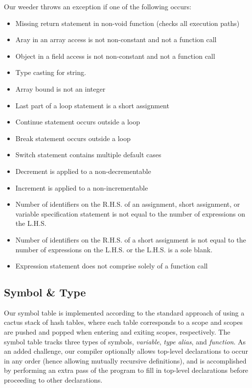 \documentclass{article}
\begin{document}
Our weeder throws an exception if one of the following occurs:
\begin{itemize}
\item Missing return statement in non-void function (checks all execution paths)
\item Aray in an array access is not non-constant and not a function call
\item Object in a field access is not non-constant and not a function call
\item Type casting for string.
\item Array bound is not an integer
\item Last part of a loop statement is a short assignment
\item Continue statement occurs outside a loop
\item Break statement occurs outside a loop
\item Switch statement contains multiple default cases
\item Decrement is applied to a non-decrementable
\item Increment is applied to a non-incrementable
\item Number of identifiers on the R.H.S. of an assignment, short assignment, or variable specification statement is not equal to the number of expressions on the L.H.S.
\item Number of identifiers on the R.H.S. of a short assignment is not equal to the number of expressions on the L.H.S. or the L.H.S. is a sole blank.
\item Expression statement does not comprise solely of a function call
\end{itemize}

\subsection{Symbol \& Type}

Our symbol table is implemented according to the standard approach of using a cactus stack of hash tables, where each table corresponds to a scope and scopes are pushed and popped when entering and exiting scopes, respectively. The symbol table tracks three types of symbols, \textit{variable}, \textit{type alias}, and \textit{function}. As an added challenge, our compiler optionally allows top-level declarations to occur in any order (hence allowing mutually recursive definitions), and is accomplished by performing an extra pass of the program to fill in top-level declarations before proceeding to other declarations.
\end{document}
